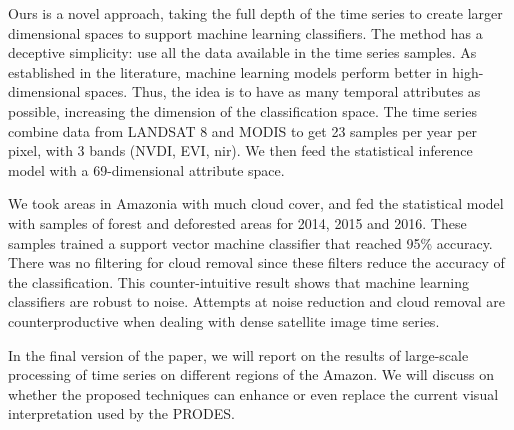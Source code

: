 \documentclass[11pt,]{article}
\begin{document}
Ours is a novel approach, taking the full depth of the time series to
create larger dimensional spaces to support machine learning
classifiers. The method has a deceptive simplicity: use all the data
available in the time series samples. As established in the literature,
machine learning models perform better in high-dimensional spaces. Thus,
the idea is to have as many temporal attributes as possible, increasing
the dimension of the classification space. The time series combine data
from LANDSAT 8 and MODIS to get 23 samples per year per pixel, with 3
bands (NVDI, EVI, nir). We then feed the statistical inference model
with a 69-dimensional attribute space.

We took areas in Amazonia with much cloud cover, and fed the statistical
model with samples of forest and deforested areas for 2014, 2015 and
2016. These samples trained a support vector machine classifier that
reached 95\% accuracy. There was no filtering for cloud removal since
these filters reduce the accuracy of the classification. This
counter-intuitive result shows that machine learning classifiers are
robust to noise. Attempts at noise reduction and cloud removal are
counterproductive when dealing with dense satellite image time series.

In the final version of the paper, we will report on the results of
large-scale processing of time series on different regions of the
Amazon. We will discuss on whether the proposed techniques can enhance
or even replace the current visual interpretation used by the PRODES.
\newpage
\singlespacing

\end{document}
